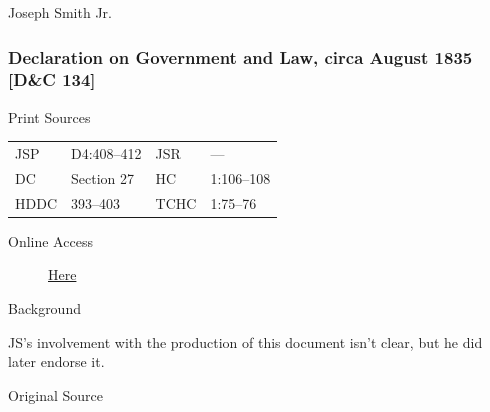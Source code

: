 				\begin{tightcenter}
				Joseph Smith Jr.
				\end{tightcenter}
				
		\subsubsection{Declaration on Government and Law, circa August 1835 [D\&C 134]}
			\label{EMS-1835-JS-CIR-AUG-1835-GOV}
			
			\begin{description}
				\item[Print Sources]
			\end{description}

				\begin{tabular}{p{0.5in}p{1in}p{0.5in}p{1in}}
				JSP	 	& D4:408--412		& JSR 		& --- \\
				DC	 	& Section 27 		& HC 		& 1:106--108 \\
				HDDC 	& 393--403			& TCHC 		& 1:75--76 \\
				\end{tabular}
			
			\begin{description}
				\item[Online Access] \href{https://www.josephsmithpapers.org/paper-summary/appendix-4-declaration-on-government-and-law-circa-august-1835-dc-134/1}{Here}
			\end{description}
			
			\begin{description}
				\item[Background]
			\end{description}
			
				JS's involvement with the production of this document isn't clear, but he did later endorse it.
			
			
			\begin{description}
				\item[Original Source]
			\end{description}
			
